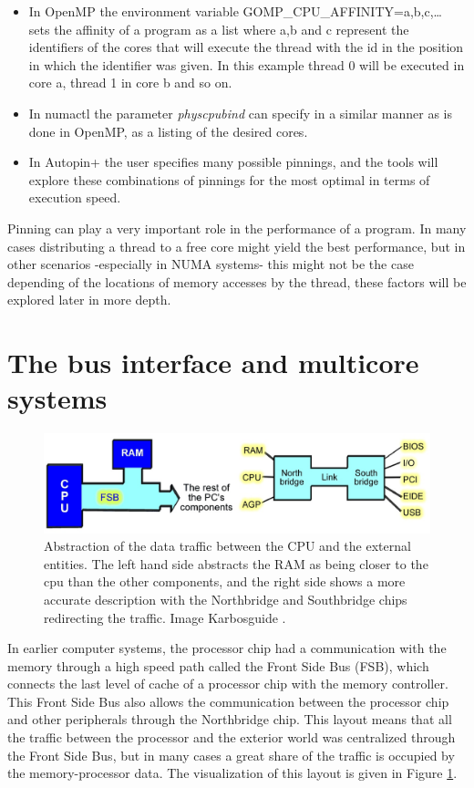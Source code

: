 \begin{itemize}
	\item In OpenMP the environment variable GOMP\_CPU\_AFFINITY=a,b,c,… sets the affinity of a program as a list where a,b and c represent the identifiers of the cores that will execute the thread with the id in the position in which the identifier was given. In this example thread 0 will be executed in core a, thread 1 in core b and so on.
	\item In numactl the parameter \textit{physcpubind} can specify in a similar manner as is done in OpenMP, as a listing of the desired cores.
	\item In Autopin+ the user specifies many possible pinnings, and the tools will explore these combinations of pinnings for the most optimal in terms of execution speed.
\end{itemize}
Pinning can play a very important role in the performance of a program. In many cases distributing a thread to a free core might yield the best performance, but in other scenarios -especially in NUMA systems- this might not be the case depending of the locations of memory accesses by the thread, these factors will be explored later in more depth. 

\section{The bus interface and multicore systems}\label{section:businterface}
\begin{figure}
	\centering
		\includegraphics[width=.9\textwidth]{figures/bus-abstraction.eps}
		\caption[bus-abtraction]{Abstraction of the data traffic between the CPU and the external entities. The left hand side abstracts the RAM as being closer to the cpu than the other components, and the right side shows a more accurate description with the Northbridge and Southbridge chips redirecting the traffic. Image Karbosguide \cite{pcarch-carbo}. }
		\label{fig:bus-abs}
\end{figure}

In earlier computer systems, the processor chip had a communication with the memory through a high speed path called the Front Side Bus (FSB), which connects the last level of cache of a processor chip with the memory controller. This Front Side Bus also allows the communication between the processor chip and other peripherals through the Northbridge chip. This layout means that all the traffic between the processor and the exterior world was centralized through the Front Side Bus, but in many cases a great share of the traffic is occupied by the memory-processor data. The visualization of this layout is given in Figure \ref{fig:bus-abs}. 

